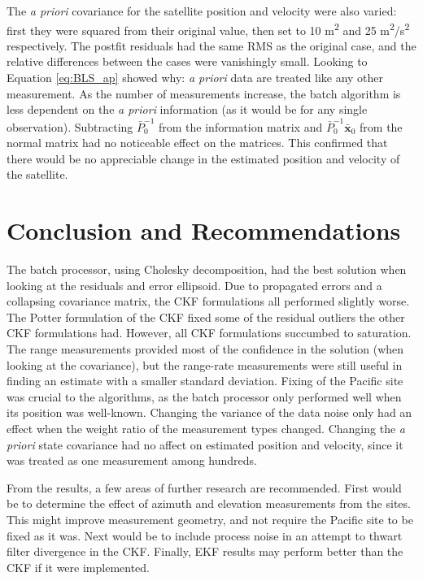 \documentclass[]{aiaa-tc}%
\begin{document}
	\vspace{5 mm}

	The \textit{a priori} covariance for the satellite position and velocity were also varied: first they were squared from their original value, then set to 10 m\textsuperscript{2} and 25 m\textsuperscript{2}/s\textsuperscript{2} respectively.  The postfit residuals had the same RMS as the original case, and the relative differences between the cases were vanishingly small.  Looking to Equation \ref{eq:BLS_ap} showed why: \textit{a priori} data are treated like any other measurement.  As the number of measurements increase, the batch algorithm is less dependent on the \textit{a priori} information (as it would be for any single observation). Subtracting $\bar{P}_0^{-1}$ from the information matrix and $\bar{P}_0^{-1}\bar{\mathbf{x}}_0$ from the normal matrix had no noticeable effect on the matrices. This confirmed that there would be no appreciable change in the estimated position and velocity of the satellite. 

	\section{Conclusion and Recommendations}
	
	The batch processor, using Cholesky decomposition, had the best solution when looking at the residuals and error ellipsoid. Due to propagated errors and a collapsing covariance matrix, the CKF formulations all performed slightly worse.  The Potter formulation of the CKF fixed some of the residual outliers the other CKF formulations had. However, all CKF formulations succumbed to saturation.  The range measurements provided most of the confidence in the solution (when looking at the covariance), but the range-rate measurements were still useful in finding an estimate with a smaller standard deviation. Fixing of the Pacific site was crucial to the algorithms, as the batch processor only performed well when its position was well-known. Changing the variance of the data noise only had an effect when the weight ratio of the measurement types changed. Changing the \textit{a priori} state covariance had no affect on estimated position and velocity, since it was treated as one measurement among hundreds.
	
	\vspace{5 mm}

	From the results, a few areas of further research are recommended. First would be to determine the effect of azimuth and elevation measurements from the sites.  This might improve measurement geometry, and not require the Pacific site to be fixed as it was.  Next would be to include process noise in an attempt to thwart filter divergence in the CKF.  Finally, EKF results may perform better than the CKF if it were implemented.
	
\end{document}
